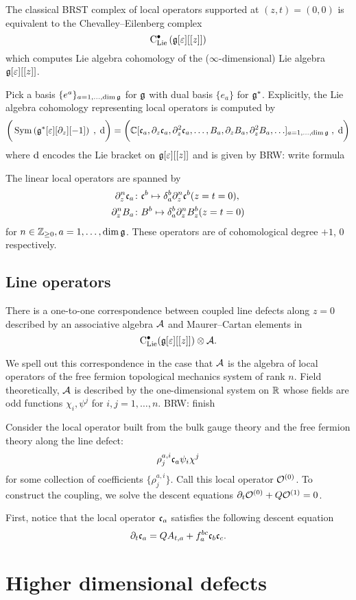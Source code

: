 \documentclass[11pt]{amsart}
\def\ep{\varepsilon}
\def\brian#1{{\textcolor{blue!65!red}{BRW: {#1}}}}
\begin{document}
The classical BRST complex of local operators supported at $(z,t) = (0,0)$ is equivalent to the Chevalley--Eilenberg complex
\[
\clie^\bu \left(\fg[\ep][[z]]\right)
\] 
which computes Lie algebra cohomology of the ($\infty$-dimensional) Lie algebra $\fg[\ep][[z]]$. 

Pick a basis $\{e^a\}_{a = 1,\ldots, \dim \mathfrak g}$ for $\mathfrak g$ with dual basis $\{e_a\}$ for $\mathfrak g^*$. 
Explicitly, the Lie algebra cohomology representing local operators is computed by 
\[
\bigg(\Sym\left(\fg^*[\ep] [\partial_z] [-1] \right) \; , \; \d \bigg) = \bigg(\CC[\fc_a, \partial_z \fc_a , \partial^2_z \fc_a, \ldots, B_a , \partial_z B_a , \partial_z^2 B_a, \ldots]_{a=1, \ldots, \dim \fg} \; , \; \d \bigg)
\]
where ${\rm d}$ encodes the Lie bracket on $\fg[\ep][[z]]$ and is given by \brian{write formula}

The linear local operators are spanned by 
\begin{align*}
\partial_z^n \mathfrak c_a \colon & \mathfrak c^b \mapsto \delta_a^b \partial^n_z \mathfrak c^b (z=t=0), \\
\partial_z^n B_a \colon & B^b \mapsto \delta_a^b \partial_z^n B^b_z (z=t=0) 
\end{align*}
for $n \in \mathbb Z_{\geq 0}, a = 1,\ldots, \dim \mathfrak g$. 
These operators are of cohomological degree $+1$, $0$ respectively. 

\subsection*{Line operators}

There is a one-to-one correspondence between coupled line defects along $z = 0$ described by an associative algebra $\mathcal A$ and Maurer--Cartan elements in 
\[
\clie^\bu(\fg[\ep][[z]]) \otimes \cA .
\]

We spell out this correspondence in the case that $\mathcal A$ is the algebra of local operators of the free fermion topological mechanics system of rank $n$. 
Field theoretically, $\mathcal A$ is described by the one-dimensional system on $\mathbb R$ whose fields are odd functions $\chi_i, \psi^j$ for $i,j=1,\ldots, n$. 
\brian{finish}

Consider the local operator built from the bulk gauge theory and the free fermion theory along the line defect:
\[
\rho_j^{a,i} \mathfrak c_a \psi_i \chi^j 
\]
for some collection of coefficients $\{\rho_j^{a,i}\}$. 
Call this local operator $\mathcal O^{(0)}$. 
To construct the coupling, we solve the descent equations $\partial_t \mathcal O^{(0)} + Q \mathcal O^{(1)} = 0$.

First, notice that the local operator $\mathfrak c_a$ satisfies the following descent equation
\[
\partial_t \mathfrak c_a = Q A_{t, a} + f_{a}^{bc} \mathfrak c_b \mathfrak c_c .
\]


\section{Higher dimensional defects} 

\end{document}
